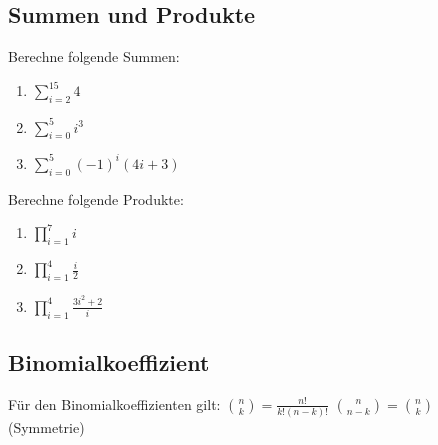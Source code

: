 \documentclass[11pt, a4paper]{article}
\newif\ifshowsolution
\begin{document}
\subsection{Summen und Produkte}
Berechne folgende Summen:
\begin{enumerate}
	\item $\sum_{i=2}^{15} 4$
	
	\ifshowsolution
		$\sum_{i=2}^{15} = 14 \cdot 4 = 56$
	\fi
	
	\item $\sum_{i=0}^5 i^3$
	
	\ifshowsolution
		$\sum_{i=0}^5 i^3 = 0 + 1 + 8 + 27 + 64 + 125 = 225$
	\fi
	
	\item $\sum_{i=0}^5 (-1)^i (4i+3)$
	
	\ifshowsolution
		$\sum_{i=0}^5 (-1)^i (4i+3) = 3-7+11-15+19-23 = -12$
	\fi
\end{enumerate}

Berechne folgende Produkte:
\begin{enumerate}
	\item $\prod_{i=1}^7 i$
	
	\ifshowsolution
		$\prod_{i=1}^7 i = 1 \cdot 2 \dots 6 \cdot 7 = 5040$
	\fi
	
	\item $\prod_{i=1}^4 \frac{i}{2}$
	
	\ifshowsolution
		$\prod_{i=1}^4 \frac{i}{2} = \frac{1}{2} \cdot \frac{2}{2} \cdot \frac{3}{2} \cdot \frac{4}{2} = \frac{24}{2^4} = \frac{3}{2}$
	\fi
	
	\item $\prod_{i=1}^4 \frac{3i^2+2}{i}$
	
	\ifshowsolution
		$\prod_{i=1}^4 \frac{3i^2+2}{i} = \frac{5}{1} \cdot \frac{14}{2} \cdot \frac{29}{3} \cdot \frac{50}{4} = 5 \cdot 7 \cdot \frac{29}{3} \cdot \frac{25}{2} = \frac{25375}{6}$
	\fi
	
\end{enumerate}

\subsection{Binomialkoeffizient}
Für den Binomialkoeffizienten gilt:
$\binom{n}{k} = \frac{n!}{k!(n-k)!}$ \qquad $\binom{n}{n-k} = \binom{n}{k}$ (Symmetrie)
\end{document}
